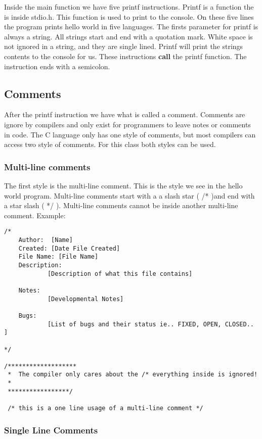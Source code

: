 \documentclass[10pt,a4paper]{paper}
\begin{document}
Inside the main function we have five printf instructions.  Printf is a function the is inside stdio.h.  This function is used to print to the console.  On these five lines the program prints hello world in five languages.  The firsts parameter for printf is always a string.  All strings start and end with a quotation mark.  White space is not ignored in a string, and they are single lined.  Printf will print the strings contents to the console for us.  These instructions \textbf{call} the printf function.  The instruction ends with a semicolon.  

\subsection*{Comments}

After the printf instruction we have what is called a comment.  Comments are ignore by compilers and only exist for programmers to leave notes or comments in code.  The C language only has one style of comments, but most compilers can access two style of comments.  For this class both styles can be used.

\subsubsection*{Multi-line comments}

The first style is the multi-line comment.  This is the style we see in the hello world program.   Multi-line comments start with a a slash star ( /*  )and end with a star slash ( */ ).  Multi-line comments cannot be inside another multi-line comment.  Example:

\begin{lstlisting}
/*
	Author:  [Name]
	Created: [Date File Created]
	File Name: [File Name]
	Description:
			[Description of what this file contains]
			
	Notes:
			[Developmental Notes]
			
	Bugs:
			[List of bugs and their status ie.. FIXED, OPEN, CLOSED.. ]
			
*/

/*******************
 *  The compiler only cares about the /* everything inside is ignored!
 *
 *****************/
 
 /* this is a one line usage of a multi-line comment */
\end{lstlisting}

\subsubsection*{Single Line Comments}
\end{document}
